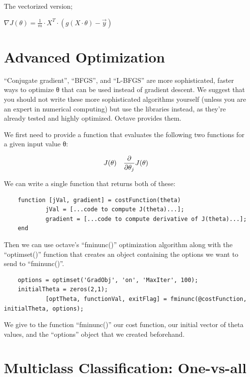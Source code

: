 \documentclass[
]{book}
\begin{document}
The vectorized version;

\(\nabla J(\theta) = \frac{1}{m} \cdot X^T \cdot \left(g\left(X\cdot\theta\right) - \vec{y}\right)\)

\hypertarget{advanced-optimization}{%
\section{Advanced Optimization}\label{advanced-optimization}}

``Conjugate gradient'', ``BFGS'', and ``L-BFGS'' are more sophisticated, faster ways to optimize θ that can be used instead of gradient descent. We suggest that you should not write these more sophisticated algorithms yourself (unless you are an expert in numerical computing) but use the libraries instead, as they're already tested and highly optimized. Octave provides them.

We first need to provide a function that evaluates the following two functions for a given input value θ:

\begin{align} & J(\theta) \newline \newline & \dfrac{\partial}{\partial \theta_j}J(\theta)\end{align}

We can write a single function that returns both of these:

\begin{verbatim}
    function [jVal, gradient] = costFunction(theta)
            jVal = [...code to compute J(theta)...];
            gradient = [...code to compute derivative of J(theta)...];
    end
\end{verbatim}

Then we can use octave's ``fminunc()'' optimization algorithm along with the ``optimset()'' function that creates an object containing the options we want to send to ``fminunc()''.

\begin{verbatim}
    options = optimset('GradObj', 'on', 'MaxIter', 100);
    initialTheta = zeros(2,1);
            [optTheta, functionVal, exitFlag] = fminunc(@costFunction, initialTheta, options);
\end{verbatim}

We give to the function ``fminunc()'' our cost function, our initial vector of theta values, and the ``options'' object that we created beforehand.

\hypertarget{multiclass-classification-one-vs-all}{%
\section{Multiclass Classification: One-vs-all}\label{multiclass-classification-one-vs-all}}
\end{document}
